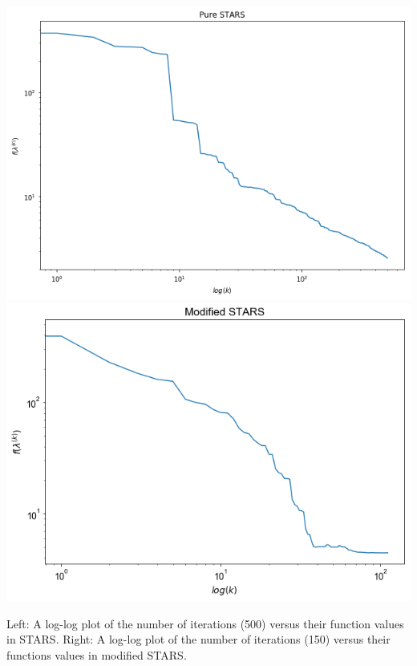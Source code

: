 \documentclass[11pt]{beamer}
\begin{document}
\begin{frame}


\begin{center}

 
\includegraphics[scale=0.25]{pure_stars.png} \includegraphics[scale=0.242]{mod_stars.png}

Left: A log-log plot of the number of iterations (500) versus their function values in STARS. Right: A log-log plot of the number of iterations (150) versus their functions values in modified STARS.

\end{center}


\end{frame}

\end{document}
